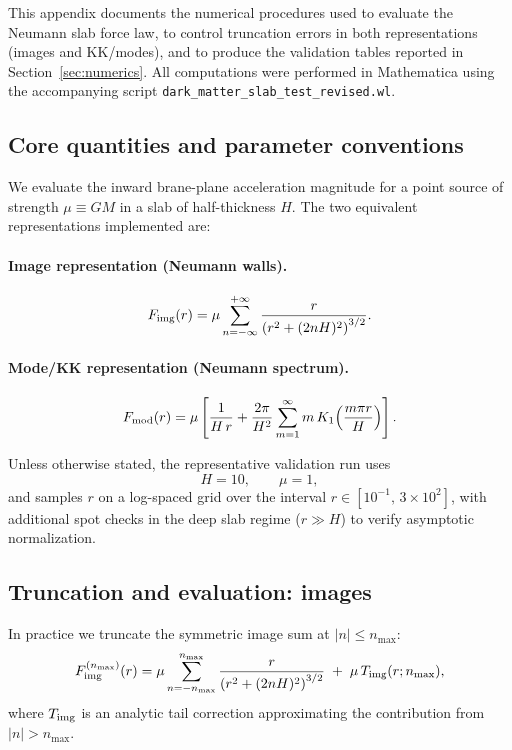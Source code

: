 \documentclass[11pt]{article}
\begin{document}
This appendix documents the numerical procedures used to evaluate the Neumann slab force law, to
control truncation errors in both representations (images and KK/modes), and to produce the
validation tables reported in Section~\ref{sec:numerics}.
All computations were performed in Mathematica using the accompanying script
\texttt{dark\_matter\_slab\_test\_revised.wl}.

\subsection{Core quantities and parameter conventions}

We evaluate the inward brane-plane acceleration magnitude for a point source of strength
$\mu\equiv GM$ in a slab of half-thickness $H$.
The two equivalent representations implemented are:

\paragraph{Image representation (Neumann walls).}
\begin{equation}
  F_{\rm img}(r)
  = \mu\sum_{n=-\infty}^{+\infty}
  \frac{r}{\left(r^2+(2nH)^2\right)^{3/2}}.
  \label{eq:app_num_Fimg}
\end{equation}

\paragraph{Mode/KK representation (Neumann spectrum).}
\begin{equation}
  F_{\rm mod}(r)
  = \mu\left[
    \frac{1}{H\,r}
    +\frac{2\pi}{H^2}\sum_{m=1}^{\infty}
    m\,K_1\!\left(\frac{m\pi r}{H}\right)
  \right].
  \label{eq:app_num_Fmod}
\end{equation}

Unless otherwise stated, the representative validation run uses
\begin{equation}
  H=10,\qquad \mu=1,
\end{equation}
and samples $r$ on a log-spaced grid over the interval $r\in[10^{-1},\,3\times 10^2]$, with additional
spot checks in the deep slab regime ($r\gg H$) to verify asymptotic normalization.

\subsection{Truncation and evaluation: images}

In practice we truncate the symmetric image sum at $|n|\le n_{\max}$:
\begin{equation}
  F_{\rm img}^{(n_{\max})}(r)
  = \mu\sum_{n=-n_{\max}}^{n_{\max}}
  \frac{r}{\left(r^2+(2nH)^2\right)^{3/2}}
  \;+\;\mu\,T_{\rm img}(r;n_{\max}),
  \label{eq:app_num_img_trunc}
\end{equation}
where $T_{\rm img}$ is an analytic tail correction approximating the contribution from $|n|>n_{\max}$.
\end{document}
